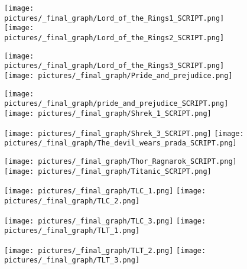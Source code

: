 \begin{figure} \ContinuedFloat
        \centering
        \texttt{[image: pictures/\_final\_graph/Lord\_of\_the\_Rings1\_SCRIPT.png]}
        \texttt{[image: pictures/\_final\_graph/Lord\_of\_the\_Rings2\_SCRIPT.png]}
\end{figure}
\begin{figure} \ContinuedFloat
        \centering
        \texttt{[image: pictures/\_final\_graph/Lord\_of\_the\_Rings3\_SCRIPT.png]}
        \texttt{[image: pictures/\_final\_graph/Pride\_and\_prejudice.png]}
\end{figure}
\begin{figure} \ContinuedFloat
        \centering
        \texttt{[image: pictures/\_final\_graph/pride\_and\_prejudice\_SCRIPT.png]}
        \texttt{[image: pictures/\_final\_graph/Shrek\_1\_SCRIPT.png]}
\end{figure}
\begin{figure} \ContinuedFloat
        \centering
        \texttt{[image: pictures/\_final\_graph/Shrek\_3\_SCRIPT.png]}
        \texttt{[image: pictures/\_final\_graph/The\_devil\_wears\_prada\_SCRIPT.png]}
\end{figure}
\begin{figure} \ContinuedFloat
        \centering
        \texttt{[image: pictures/\_final\_graph/Thor\_Ragnarok\_SCRIPT.png]}
        \texttt{[image: pictures/\_final\_graph/Titanic\_SCRIPT.png]}
\end{figure}
\begin{figure} \ContinuedFloat
        \centering
        \texttt{[image: pictures/\_final\_graph/TLC\_1.png]}
        \texttt{[image: pictures/\_final\_graph/TLC\_2.png]}
\end{figure}
\begin{figure} \ContinuedFloat
        \centering
        \texttt{[image: pictures/\_final\_graph/TLC\_3.png]}
        \texttt{[image: pictures/\_final\_graph/TLT\_1.png]}
\end{figure}
\begin{figure} \ContinuedFloat
        \centering
        \texttt{[image: pictures/\_final\_graph/TLT\_2.png]}
        \texttt{[image: pictures/\_final\_graph/TLT\_3.png]}
\end{figure}
